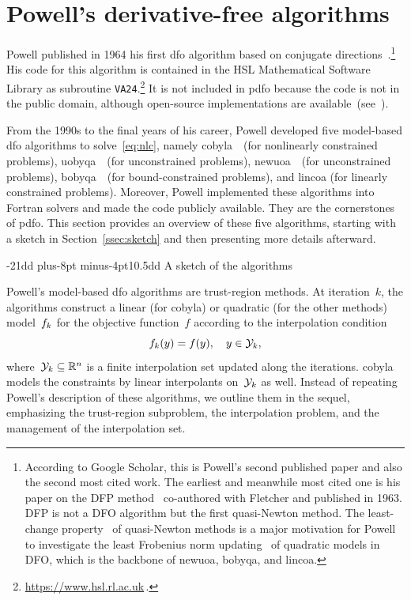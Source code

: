 \documentclass[
    smallextended,  %
    final,          %
]{svjour3}
\makeatletter
\newcommand{\R}{\mathbb{R}}
\newcommand{\objm}[1][k]{\obj\ifthenelse{\equal{#1}{}}{}{_{#1}}}
\newcommand{\obj}{f}
\newcommand{\xpt}[1][k]{\mathcal{Y}\ifthenelse{\equal{#1}{}}{}{_{#1}}}
\def\subsection{\@startsection{subsection}{2}{\z@}%
    {-21dd plus-8pt minus-4pt}{10.5dd}
     {\normalsize\bfseries}}
\makeatother
\begin{document}
\section{Powell's derivative-free algorithms}
\label{sec:powell}

Powell published in 1964 his first \gls{dfo} algorithm based on conjugate
directions~\cite{Powell_1964}.\footnote{According to Google Scholar, this is Powell's second published paper and also the second most cited work.
The earliest and meanwhile most cited one is his paper on the DFP method~\cite{Fletcher_Powell_1963}
co-authored with Fletcher and published in 1963. DFP is not a DFO algorithm but the first
quasi-Newton method. The least-change property~\cite{Dennis_Schnabel_1979} of quasi-Newton methods
is a major motivation for Powell to investigate the least Frobenius norm updating~\cite{Powell_2004b}
of quadratic models in DFO, which is the backbone of \gls{newuoa}, \gls{bobyqa}, and \gls{lincoa}.}
His code for this algorithm is contained in the
HSL Mathematical Software Library as subroutine \texttt{VA24}.\footnote{\url{https://www.hsl.rl.ac.uk}\,.}
It is not included in \gls{pdfo} because the code is not in the public domain, although open-source implementations are available~(see~\cite[footnote~4]{Conn_Scheinberg_Toint_1997b}).

From the 1990s to the final years of his career, Powell developed five model-based \gls{dfo}
algorithms to solve~\eqref{eq:nlc}, namely \gls{cobyla}~\cite{Powell_1994}~(for nonlinearly
constrained problems), \gls{uobyqa}~\cite{Powell_2002}~(for unconstrained problems),
\gls{newuoa}~\cite{Powell_2006}~(for unconstrained problems), \gls{bobyqa}~\cite{Powell_2009}~(for
bound-constrained problems), and \gls{lincoa} (for linearly constrained problems).
Moreover, Powell implemented these algorithms into Fortran solvers and made the code publicly available.
They are the cornerstones of \gls{pdfo}.
This section provides an overview of these five algorithms, starting with a sketch in
Section~\ref{ssec:sketch} and then presenting more details afterward.

\subsection{A sketch of the algorithms}
\label{ssec:sketch}

Powell's model-based \gls{dfo} algorithms are trust-region methods.
At iteration~$k$, the algorithms construct a linear (for \gls{cobyla}) or quadratic (for the other
methods) model~$\objm$ for the objective function~$f$ according to the interpolation condition
\begin{equation}
    \label{eq:itpls}
    \objm(y) = \obj(y), \quad y \in \xpt,
\end{equation}
where~$\xpt \subseteq \R^n$ is a finite interpolation set updated along the iterations.
\Gls{cobyla} models the constraints by linear interpolants on~$\xpt$ as well.
Instead of repeating Powell's description of these algorithms, we outline them in the sequel, emphasizing the trust-region subproblem, the interpolation problem, and the management of the interpolation set.
\end{document}
